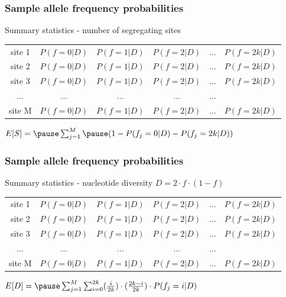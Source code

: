 \begin{frame}
\frametitle{Sample allele frequency probabilities}

        Summary statistics - number of segregating sites

        \small{
        \begin{center}
                \begin{tabular}{| c | c | c | c | c | c |}
                        \hline
                        site 1 & $P(f=0|D)$ & $P(f=1|D)$ & $P(f=2|D)$ & ... & $P(f=2k|D)$\\
			site 2 & $P(f=0|D)$ & $P(f=1|D)$ & $P(f=2|D)$ & ... & $P(f=2k|D)$\\
			site 3 & $P(f=0|D)$ & $P(f=1|D)$ & $P(f=2|D)$ & ... & $P(f=2k|D)$\\
			... & ... & ... & ... & ...\\
			site M & $P(f=0|D)$ & $P(f=1|D)$ & $P(f=2|D)$ & ... & $P(f=2k|D)$\\
                        \hline
                \end{tabular}
        \end{center}
        }

        \begin{center}
                \Large{
                $E[S] = \pause \sum_{j=1}^M \pause (1 - P(f_j=0|D) - P(f_j=2k|D)) $   
                }
        \end{center}

\end{frame}


\begin{frame}
\frametitle{Sample allele frequency probabilities}

        Summary statistics - nucleotide diversity $D=2 \cdot f \cdot (1-f)$

        \small{
        \begin{center} 
                \begin{tabular}{| c | c | c | c | c | c |}
                        \hline
                        site 1 & $P(f=0|D)$ & $P(f=1|D)$ & $P(f=2|D)$ & ... & $P(f=2k|D)$\\
                        site 2 & $P(f=0|D)$ & $P(f=1|D)$ & $P(f=2|D)$ & ... & $P(f=2k|D)$\\
                        site 3 & $P(f=0|D)$ & $P(f=1|D)$ & $P(f=2|D)$ & ... & $P(f=2k|D)$\\
                        ... & ... & ... & ... & ...\\
                        site M & $P(f=0|D)$ & $P(f=1|D)$ & $P(f=2|D)$ & ... & $P(f=2k|D)$\\
                        \hline  
                \end{tabular}
        \end{center}
        }

        \begin{center}
                \Large{
                $E[D] = \pause \sum_{j=1}^M \sum_{i=0}^{2k}  (\frac{i}{2k}) \cdot (\frac{2k-i}{2k}) \cdot P(f_j=i|D) $
                }
        \end{center}

\end{frame}

